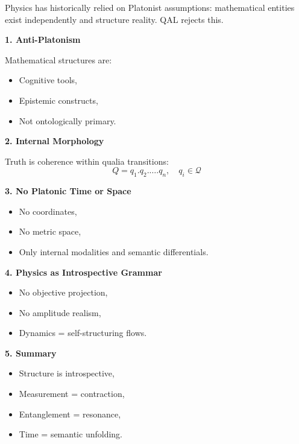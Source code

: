 \documentclass[11pt]{article}
\numberwithin{equation}{section} %
\begin{document}
Physics has historically relied on Platonist assumptions: mathematical entities exist independently and structure reality. QAL rejects this.

\bigskip

\textbf{1. Anti-Platonism}

Mathematical structures are:
\begin{itemize}
  \item Cognitive tools,
  \item Epistemic constructs,
  \item Not ontologically primary.
\end{itemize}

\bigskip

\textbf{2. Internal Morphology}

Truth is coherence within qualia transitions:
\begin{equation}
Q = q_1 . q_2 . \dots . q_n, \quad q_i \in \mathcal{Q}
\end{equation}

\bigskip

\textbf{3. No Platonic Time or Space}

\begin{itemize}
  \item No coordinates,
  \item No metric space,
  \item Only internal modalities and semantic differentials.
\end{itemize}

\bigskip

\textbf{4. Physics as Introspective Grammar}

\begin{itemize}
  \item No objective projection,
  \item No amplitude realism,
  \item Dynamics = self-structuring flows.
\end{itemize}

\bigskip

\textbf{5. Summary}

\begin{itemize}
  \item Structure is introspective,
  \item Measurement = contraction,
  \item Entanglement = resonance,
  \item Time = semantic unfolding.
\end{itemize}
\end{document}
